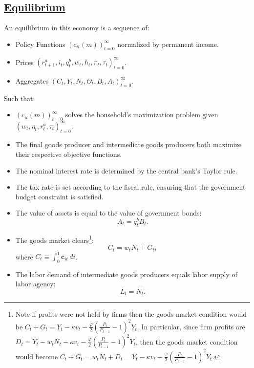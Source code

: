 \documentclass[\latexroot/\projectname]{subfiles}
\begin{document}
\subsection{\href{\WebBase\#sec:hank-equilibrium}{Equilibrium}}\whenintegrated{\label{sec:hank-equilibrium}}

An equilibrium in this economy is a sequence of:
\begin{itemize}[label=--]
  \item
        Policy Functions ${\left( c_{it}(m) \right )}_{t=0}^{\infty}$ normalized by permanent income.
  \item
        Prices $ {\left( r^{a}_{t+1}, i_{t}, q^{b}_{t},  w_{t}, h_{t} , \pi_{t} , \tau_{t} \right) }_{t=0}^{\infty}$.
  \item
        Aggregates $ {\left(C_{t}, Y_{t} , N_{t},   \Theta_{t},  B_{t} , A_{t}  \right)}_{t=0}^{\infty}$.
\end{itemize}

Such that:
\begin{itemize}[label=--]
  \item
        ${\left(c_{it}(m)\right)}_{t=0}^{\infty}$  solves the household's maximization problem given ${\left( w_{t}, \eta_{t},  r^{a}_{t} , \tau_{t} \right)}_{t=0}^{\infty}$.
  \item
        The final goods producer and intermediate goods producers both maximize their respective objective functions.
  \item
        The nominal interest rate is determined by the central bank's Taylor rule.
  \item
        The tax rate is set according to the fiscal rule, ensuring that the government budget constraint is satisfied.
  \item
        The value of assets is equal to the value of government bonds:
        \[
          A_t =  q^{b}_{t}B_{t}.
        \]
  \item
        The goods market clears\footnote{Note if profits were not held by firms then the goods market condition would be $ C_{t}  + G_{t}  = Y_{t} -  \kappa v_{t} - \frac{\varphi}{2}{\left( \frac{P_{t}}{P_{t-1}} - 1\right)}^{2} Y_{t}  $.  In particular, since firm profits are $D_{t} = Y_{t} -  w_{t} N_{t}  - \kappa v_{t} - \frac{\varphi}{2}{\left( \frac{P_{t}}{P_{t-1}} - 1\right)}^{2} Y_{t} $, then the goods market condition would become $ C_{t}  + G_{t}  =w_{t} N_{t}  + D_{t} = Y_{t} -  \kappa v_{t} - \frac{\varphi}{2}{\left( \frac{P_{t}}{P_{t-1}} - 1\right)}^{2} Y_{t}  $. }:
        \[
          C_{t}  = w_{t} N_{t}  + G_{t},
        \]
        where $C_{t} \equiv  \int_{0}^{1} \textbf{c}_{it} \, di$.
  \item
        The labor demand of intermediate goods producers equals labor supply of labor agency:
        \[
          L_{t} =  N_{t}.
        \]
\end{itemize}
\end{document}
